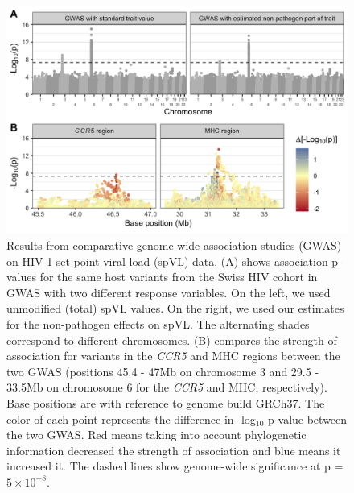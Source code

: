 \documentclass[11pt]{article}
\begin{document}
\begin{linenumbers}
\begin{figure}[H]
	\begin{center}
		\includegraphics[width=\linewidth]{fig6_Stadler_MBE-21-1179}
		\caption{Results from comparative genome-wide association studies (GWAS) on HIV-1 set-point viral load (spVL) data. (A) shows association p-values for the same host variants from the Swiss HIV cohort in GWAS with two different response variables. On the left, we used unmodified (total) spVL values. On the right, we used our estimates for the non-pathogen effects on spVL. The alternating shades correspond to different chromosomes. (B) compares the strength of association for variants in the \emph{CCR5} and MHC regions between the two GWAS (positions 45.4 - 47Mb on chromosome 3 and 29.5 - 33.5Mb on chromosome 6 for the \emph{CCR5} and MHC, respectively). Base positions are with reference to genome build GRCh37. The color of each point represents the difference in -log$_{10}$ p-value between the two GWAS. Red means taking into account phylogenetic information decreased the strength of association and blue means it increased it. The dashed lines show genome-wide significance at p = $5 \times 10^{-8}$.}
		\label{fig:gwas-results}
	\end{center}
\end{figure}


\end{linenumbers}
\end{document}
